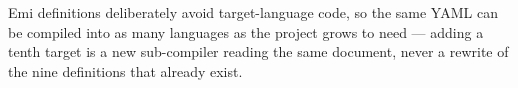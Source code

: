 \begin{pullquote}
Emi definitions deliberately avoid target-language code, so the same
YAML can be compiled into as many languages as the project grows to need
--- adding a tenth target is a new sub-compiler reading the same
document, never a rewrite of the nine definitions that already exist.
\end{pullquote}
